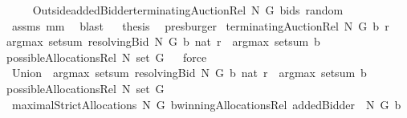 \begin{isabellebody}
\ \isamarkupfalse%
\ {\isachardoublequoteopen}{\isachardot}{\isachardot}{\isachardot}\ {\isacharequal}\ {\isacharparenleft}Outside{\isacharprime}{\isacharbraceleft}addedBidder{\isacharprime}{\isacharbraceright}{\isacharparenright}{\isacharbackquote}{\isacharparenleft}terminatingAuctionRel\ N\ G\ bids\ random{\isacharparenright}{\isachardoublequoteclose}\ \isamarkupfalse%
\ assms\ mm{}{}\ \isanewline
{}\isamarkupfalse%
\ blast\isanewline
{}\isamarkupfalse%
\ \isamarkupfalse%
\ {\isacharquery}thesis\ \isamarkupfalse%
\ presburger\isanewline
{}\isamarkupfalse%
%
\endisatagproof
{\isafoldproof}%
%
\isadelimproof
%
\endisadelimproof
\isanewline
\isanewline
\isanewline
{}\isamarkupfalse%
\ {\isachardoublequoteopen}terminatingAuctionRel\ N\ G\ b\ r\ {\isacharequal}\ \isanewline
{\isacharparenleft}{\isacharparenleft}argmax\ {\isacharparenleft}setsum\ {\isacharparenleft}resolvingBid{\isacharprime}\ N\ G\ b\ {\isacharparenleft}nat\ r{\isacharparenright}{\isacharparenright}{\isacharparenright}{\isacharparenright}\ {\isasymcirc}\ {\isacharparenleft}argmax\ {\isacharparenleft}setsum\ b{\isacharparenright}{\isacharparenright}{\isacharparenright}\isanewline
{\isacharparenleft}possibleAllocationsRel\ N\ {\isacharparenleft}set\ G{\isacharparenright}{\isacharparenright}{\isachardoublequoteclose}%
\isadelimproof
\ %
\endisadelimproof
%
\isatagproof
{}\isamarkupfalse%
\ force%
\endisatagproof
{\isafoldproof}%
%
\isadelimproof
%
\endisadelimproof
\isanewline
{}\isamarkupfalse%
\ {\isachardoublequoteopen}{\isacharparenleft}Union\ {\isasymcirc}\ {\isacharparenleft}argmax\ {\isacharparenleft}setsum\ {\isacharparenleft}resolvingBid{\isacharprime}\ N\ G\ b\ {\isacharparenleft}nat\ r{\isacharparenright}{\isacharparenright}{\isacharparenright}{\isacharparenright}\ {\isasymcirc}\ {\isacharparenleft}argmax\ {\isacharparenleft}setsum\ b{\isacharparenright}{\isacharparenright}{\isacharparenright}\isanewline
{\isacharparenleft}possibleAllocationsRel\ N\ {\isacharparenleft}set\ G{\isacharparenright}{\isacharparenright}{\isachardoublequoteclose}\isanewline
\isanewline
{}\isamarkupfalse%
\ {\isachardoublequoteopen}maximalStrictAllocations{\isacharprime}\ N\ G\ b{\isacharequal}winningAllocationsRel\ {\isacharparenleft}{\isacharbraceleft}addedBidder{\isacharprime}{\isacharbraceright}\ {\isasymunion}\ N{\isacharparenright}\ G\ b{\isachardoublequoteclose}%
\isadelimproof
\ %
\endisadelimproof
%
\isatagproof

\end{isabellebody}
